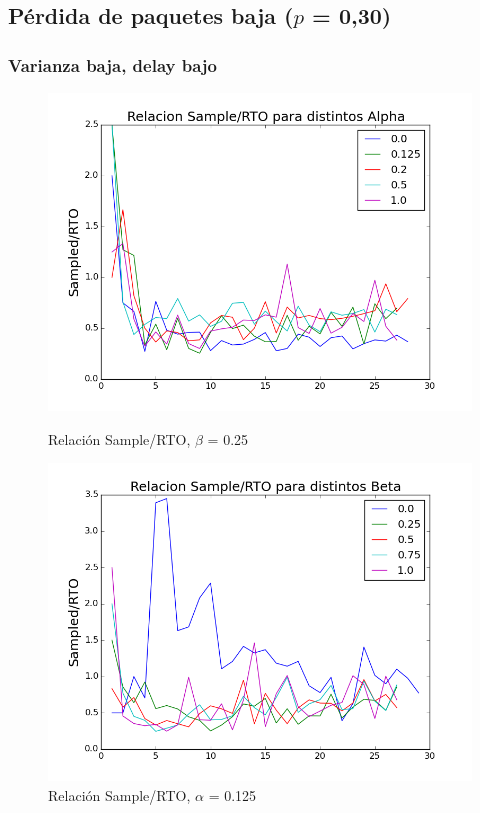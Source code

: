 \subsection{Pérdida de paquetes baja ($p$ = 0,30)}

\subsubsection{Varianza baja, delay bajo}

\begin{figure}[H]
\begin{minipage}{0.5\linewidth}
\includegraphics[width=\linewidth]{../graficos/alphad01var2drop25.png}
\caption{Relación Sample/RTO, $\beta$ = 0.25}\label{fig:alpha-var2-drop25}
\end{minipage}
\hfill
\begin{minipage}{0.5\linewidth}
\includegraphics[width=\linewidth]{../graficos/betad01var2drop25.png}
\caption{Relación Sample/RTO, $\alpha$ = 0.125}\label{fig:beta-var2-drop25}
\end{minipage}
\end{figure}

